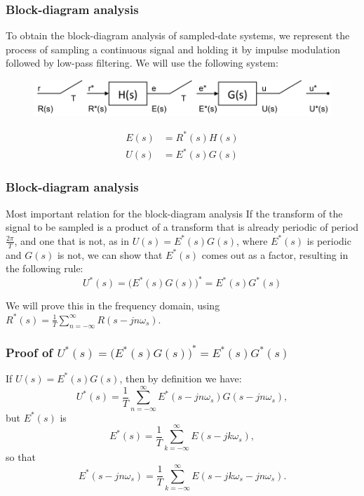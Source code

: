 \begin{frame}
	\frametitle{Block-diagram analysis}
	\justify
	To obtain the block-diagram analysis of sampled-date systems, we represent the process of sampling a continuous signal and holding it by impulse modulation followed by low-pass filtering. We will use the following system: 
	\vspace{1em}
	\begin{figure}
		\centering
		\includegraphics[width=1\linewidth]{block_analysis_1}
	\end{figure}
	\vspace{1em}
	\begin{equation}
		\begin{split}
		E(s) &= R^{*}(s)H(s)\\
		U(s) &= E^{*}(s)G(s)
		\end{split}
	\end{equation}
\end{frame}

\begin{frame}
	\frametitle{Block-diagram analysis}
	\begin{block}{Most important relation for the block-diagram analysis}
		\justify
		If the transform of the signal to be sampled is a product of a transform that is already periodic of period $\frac{2\pi}{T}$, and one that is not, as in $U(s) = E^{*}(s)G(s)$, where $E^{*}(s)$ is periodic and $G(s)$ is not, we can show that $E^{*}(s)$ comes out as a factor, resulting in the following rule: 
		\begin{equation}
		U^{*}(s) = \big(E^{*}(s)G(s)\big)^{*} = E^{*}(s)G^{*}(s)
		\end{equation}
	\end{block}
	\vspace{1em}
	We will prove this in the frequency domain, using $R^*(s)=\frac{1}{T}\sum_{n=-\infty}^{\infty}R(s-jn\omega_s)$.\\
\end{frame}

\begin{frame}
	\frametitle{Proof of $U^{*}(s) = \big(E^{*}(s)G(s)\big)^{*} = E^{*}(s)G^{*}(s)$}
	If $U(s) = E^{*}(s)G(s)$, then by definition we have:
	\begin{equation}
	U^{*}(s) = \frac{1}{T} \sum_{n=-\infty}^{\infty} E^{*}(s - jn\omega_s)G(s - jn\omega_s),
	\end{equation}
	but $E^{*}(s)$ is
	\begin{equation}
	E^{*}(s) = \frac{1}{T} \sum_{k=-\infty}^{\infty} E(s-jk\omega_s),
	\end{equation}
	so that
	\begin{equation}
	E^{*}(s-jn\omega_s) = \frac{1}{T} \sum_{k=-\infty}^{\infty} E(s - jk\omega_s - jn\omega_s).
	\end{equation}
\end{frame}

